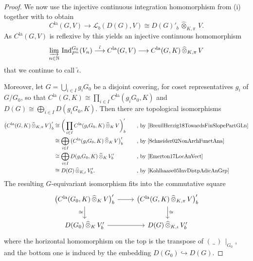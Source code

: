 \documentclass[a4paper, reqno, 10pt]{amsart}
\theoremstyle{definition}
\numberwithin{equation}{section}
\newcommand{\blank}{{\,\_\,}}
\newcommand{\cotimes}[1]{{\,\widehat{\otimes}_{#1}\,}}
\newcommand{\Ind}{{\mathrm{Ind}}}
\newcommand{\indcotimes}{{\,\widehat{\otimes}_{K,\iota}\,}}
\newcommand{\la}{{\mathrm{la}}}
\newcommand{\lra}{\longrightarrow}
\newcommand{\projcotimes}{{\,\widehat{\otimes}_{K,\pi}\,}}
\newcommand{\res}[1]{{\!\,\mid_{#1}}}
\newcommand{\BN}{{\mathbb {N}}}
\newcommand{\CL}{{\mathcal {L}}}
\begin{document}
\begin{proof}
	
	We now use the injective continuous integration homomorphism from  (i) together with \cite[Cor.\ 18.8]{Schneider02NonArchFunctAna} to obtain
	\begin{equation*}
		C^\la (G,V) \lra \CL_b (D(G),V) \cong D(G)'_b \projcotimes V .
	\end{equation*}
	As $C^\la(G,V)$ is reflexive by  this yields an injective continuous homomorphism 
	\begin{equation*}
		\varinjlim_{n\in\BN}\, \Ind^{G_0}_{P^n} (V_n) \overset{\tilde{\iota}}{\lra} C^\la (G,V) \lra C^\la (G,K) \projcotimes V
	\end{equation*}
	that we continue to call $\tilde{\iota}$.
	
	
	Moreover, let $G = \bigcup_{i\in I} g_i G_0$ be a disjoint covering, for coset representatives $g_i$ of $G/G_0$, so that $C^\la(G,K) \cong \prod_{i\in I} C^\la(g_i G_0,K)$ and $D(G) \cong \bigoplus_{i\in I} D(g_i G_0,K)$.
	Then there are topological isomorphisms
	\begin{equation*}
		\begin{aligned}
			\big( C^\la(G,K) \projcotimes V \big)'_b &\cong \bigg( \prod_{i\in I} C^\la (g_i G_0, K) \cotimes{K} V \bigg)'_b &&\quad\text{, by \cite[Lemma 2.1 (iii)]{BreuilHerzig18TowardsFinSlopePartGLn}} \\
			&\cong \bigoplus_{i\in I} \big( C^\la (g_i G_0, K) \cotimes{K} V \big)'_b &&\quad\text{, by \cite[Prop.\ 9.11]{Schneider02NonArchFunctAna}} \\
			&\cong \bigoplus_{i\in I} D(g_i G_0, K) \cotimes{K} V'_b &&\quad\text{, by \cite[Prop.\ 1.1.32 (ii)]{Emerton17LocAnVect}} \\
			&\cong D(G) \indcotimes V'_b . &&\quad\text{, by \cite[Cor.\ 1.2.14]{Kohlhaase05InvDistpAdicAnGrp}}
		\end{aligned}
	\end{equation*}
	The resulting $G$-equivariant isomorphism fits into the commutative square 
	\begin{equation*}
		\begin{tikzcd}
			\big( C^\la(G_0,K) \cotimes{K} V \big)'_b \ar[r] \ar[d, "\cong"'] & \big( C^\la(G,K) \projcotimes V \big)'_b \ar[d, "\cong"] \\
			D(G_0) \cotimes{K} V'_b \ar[r] & D(G) \indcotimes V'_b
		\end{tikzcd}
	\end{equation*}
	where the horizontal homomorphism on the top is the transpose of $(\blank)\res{G_0}$, and the bottom one is induced by the embedding $D(G_0) \hookrightarrow D(G)$.

\end{proof}
\end{document}
